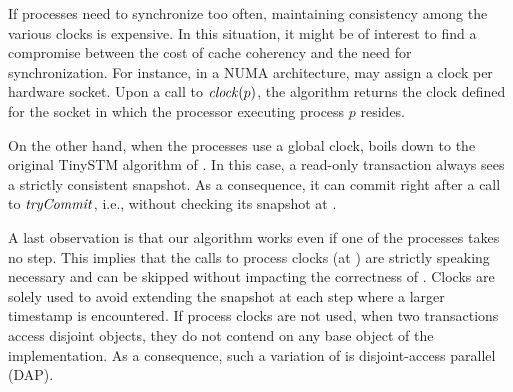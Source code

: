 If processes need to synchronize too often, maintaining consistency among the various clocks is expensive.
In this situation, it might be of interest to find a compromise between the cost of cache coherency and the need for synchronization.
For instance, in a NUMA architecture,  may assign a clock per hardware socket.
Upon a call to $\clockOf{p}$, the algorithm returns the clock defined for the socket in which the processor executing process $p$ resides.

On the other hand, when the processes use a global clock,  boils down to the original TinySTM algorithm of \citet{FelberFMR10}.
In this case, a read-only transaction always sees a strictly consistent snapshot.
As a consequence, it can commit right after a call to $\stmTryCommitFunction$, i.e., without checking its snapshot at .

A last observation is that our algorithm works even if one of the processes takes no step.
This implies that the calls to process clocks (at ) are strictly speaking necessary and can be skipped without impacting the correctness of .
Clocks are solely used to avoid extending the snapshot at each step where a larger timestamp is encountered.
If process clocks are not used, when two transactions access disjoint objects, they do not contend on any base object of the implementation.
As a consequence, such a variation of  is disjoint-access parallel (DAP).
